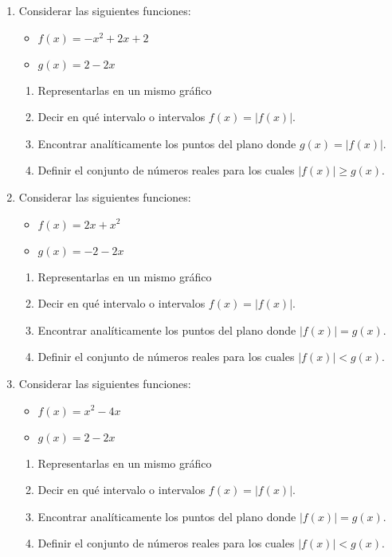 \documentclass[12pt]{article}
\theoremstyle{definition}
\begin{document}
\begin{enumerate}

\item  
Considerar las siguientes  funciones:
 	\begin{itemize}
  	      \item  $f(x) = -x^2+2x+2$
  	      \item  $g(x) = 2-2x$
      	\end{itemize}
 \begin{enumerate}
        \item Representarlas en un mismo gráfico
        \item Decir en qué intervalo o intervalos $f(x) = |f(x)|$.
        \item Encontrar analíticamente los puntos del plano donde  $g(x) = |f(x)|$.
        \item Definir el conjunto de números reales para los cuales $|f(x)|\geq g(x)$.
\end{enumerate}

\item  
Considerar las siguientes  funciones:
	\begin{itemize}
		\item  $f(x) = 2x+ x^2$
		\item  $g(x) = -2-2x$
	\end{itemize}
\begin{enumerate}
	\item Representarlas en un mismo gráfico
	\item Decir en qué intervalo o intervalos $f(x) = |f(x)|$.
	\item Encontrar analíticamente los puntos del plano donde  $|f(x)| = g(x)$.
	\item Definir el conjunto de números reales para los cuales $|f(x)|< g(x)$.
\end{enumerate}

\item  
Considerar las siguientes  funciones:
	\begin{itemize}
		\item  $f(x) = x^2-4x$
		\item  $g(x) = 2-2x$
	\end{itemize}
\begin{enumerate}
	\item Representarlas en un mismo gráfico
	\item Decir en qué intervalo o intervalos $f(x) = |f(x)|$.
	\item Encontrar analíticamente los puntos del plano donde  $|f(x)| = g(x)$.
	\item Definir el conjunto de números reales para los cuales $|f(x)|< g(x)$.
\end{enumerate}


\end{enumerate}
\end{document}
